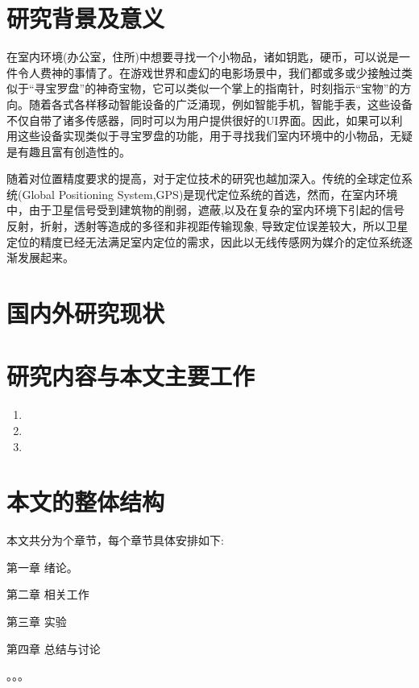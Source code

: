 \documentclass[winfonts]{njuthesis}
\begin{document}
	\section{研究背景及意义}
		在室内环境(办公室，住所)中想要寻找一个小物品，诸如钥匙，硬币，可以说是一件令人费神的事情了\cite{HyperEarAbstract}。在游戏世界和虚幻的电影场景中，我们都或多或少接触过类似于“寻宝罗盘”的神奇宝物，它可以类似一个掌上的指南针，时刻指示“宝物”的方向。随着各式各样移动智能设备的广泛涌现，例如智能手机，智能手表，这些设备不仅自带了诸多传感器，同时可以为用户提供很好的UI界面。因此，如果可以利用这些设备实现类似于寻宝罗盘的功能，用于寻找我们室内环境中的小物品，无疑是有趣且富有创造性的。
		
		随着对位置精度要求的提高，对于定位技术的研究也越加深入。传统的全球定位系统(Global Positioning System,GPS)\cite{wikipedia_GPS}是现代定位系统的首选，然而，在室内环境中，由于卫星信号受到建筑物的削弱，遮蔽,以及在复杂的室内环境下引起的信号反射，折射，透射等造成的多径和非视距传输现象, 导致定位误差较大，所以卫星定位的精度已经无法满足室内定位的需求，因此以无线传感网为媒介的定位系统逐渐发展起来。
		
		
	
	\section{国内外研究现状}


	\section{研究内容与本文主要工作}

		\begin{enumerate}
		\item
			
		\item
			
		\item 
			
		\end{enumerate}

	\section{本文的整体结构}
		本文共分为个章节，每个章节具体安排如下:
		
		第一章 绪论。
		 
		第二章 相关工作
		
		第三章 实验
		
		第四章 总结与讨论
		
		。。。
\end{document}
